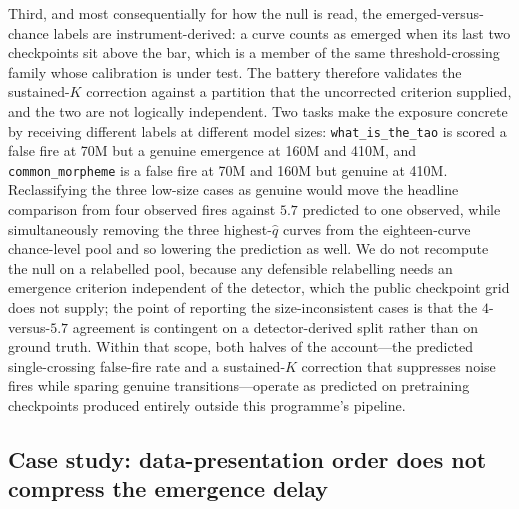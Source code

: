 \documentclass[11pt]{article}
\theoremstyle{plain}
\theoremstyle{definition}
\begin{document}
Third, and most consequentially for how the null is read, the emerged-versus-chance
labels are instrument-derived: a curve counts as emerged when its last two checkpoints sit
above the bar, which is a member of the same threshold-crossing family whose calibration is
under test. The battery therefore validates the sustained-$K$ correction against a
partition that the uncorrected criterion supplied, and the two are not logically
independent. Two tasks make the exposure concrete by receiving different labels at
different model sizes: \texttt{what\_is\_the\_tao} is scored a false fire at 70M but a
genuine emergence at 160M and 410M, and \texttt{common\_morpheme} is a false fire at 70M
and 160M but genuine at 410M. Reclassifying the three low-size cases as genuine would move
the headline comparison from four observed fires against $5.7$ predicted to one observed,
while simultaneously removing the three highest-$\hat q$ curves from the eighteen-curve
chance-level pool and so lowering the prediction as well. We do not recompute the null on
a relabelled pool, because any defensible relabelling needs an emergence criterion
independent of the detector, which the public checkpoint grid does not supply; the point of
reporting the size-inconsistent cases is that the $4$-versus-$5.7$ agreement is contingent
on a detector-derived split rather than on ground truth. Within that scope, both
halves of the account---the predicted single-crossing false-fire rate and a
sustained-$K$ correction that suppresses noise fires while sparing genuine
transitions---operate as predicted on pretraining checkpoints produced entirely
outside this programme's pipeline.

\subsection{Case study: data-presentation order does not compress the emergence delay}\label{sec:r1}
\end{document}
